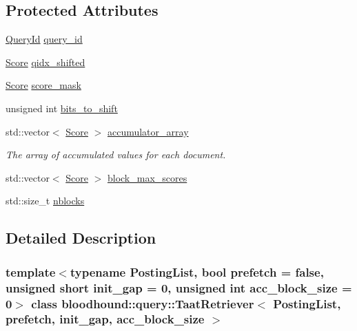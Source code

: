 \subsection*{Protected Attributes}
\begin{DoxyCompactItemize}
\item 
\mbox{\hyperlink{namespacebloodhound_1_1query_aa67214af106292b2483995adea986b08}{Query\+Id}} \mbox{\hyperlink{classbloodhound_1_1query_1_1TaatRetriever_aa9a1b8ca0cb570bcffe6b6c68e8c2e20}{query\+\_\+id}}
\item 
\mbox{\hyperlink{structbloodhound_1_1Score}{Score}} \mbox{\hyperlink{classbloodhound_1_1query_1_1TaatRetriever_aa27d16b326df60affe26e005f9abb4f6}{qidx\+\_\+shifted}}
\item 
\mbox{\hyperlink{structbloodhound_1_1Score}{Score}} \mbox{\hyperlink{classbloodhound_1_1query_1_1TaatRetriever_ac38b873ceff34b55bb8ac82800946825}{score\+\_\+mask}}
\item 
unsigned int \mbox{\hyperlink{classbloodhound_1_1query_1_1TaatRetriever_aa2b4875de4f02a856e64560bf002296f}{bits\+\_\+to\+\_\+shift}}
\item 
std\+::vector$<$ \mbox{\hyperlink{structbloodhound_1_1Score}{Score}} $>$ \mbox{\hyperlink{classbloodhound_1_1query_1_1TaatRetriever_a604c7ab279ced03ccc1866d55c844b11}{accumulator\+\_\+array}}
\begin{DoxyCompactList}\small\item\em The array of accumulated values for each document. \end{DoxyCompactList}\item 
std\+::vector$<$ \mbox{\hyperlink{structbloodhound_1_1Score}{Score}} $>$ \mbox{\hyperlink{classbloodhound_1_1query_1_1TaatRetriever_ac870574844dc3be6c40cf1236e1ff6cc}{block\+\_\+max\+\_\+scores}}
\item 
std\+::size\+\_\+t \mbox{\hyperlink{classbloodhound_1_1query_1_1TaatRetriever_a87786d9af7993da498d60304eab245cf}{nblocks}}
\end{DoxyCompactItemize}


\subsection{Detailed Description}
\subsubsection*{template$<$typename Posting\+List, bool prefetch = false, unsigned short init\+\_\+gap = 0, unsigned int acc\+\_\+block\+\_\+size = 0$>$\newline
class bloodhound\+::query\+::\+Taat\+Retriever$<$ Posting\+List, prefetch, init\+\_\+gap, acc\+\_\+block\+\_\+size $>$}

